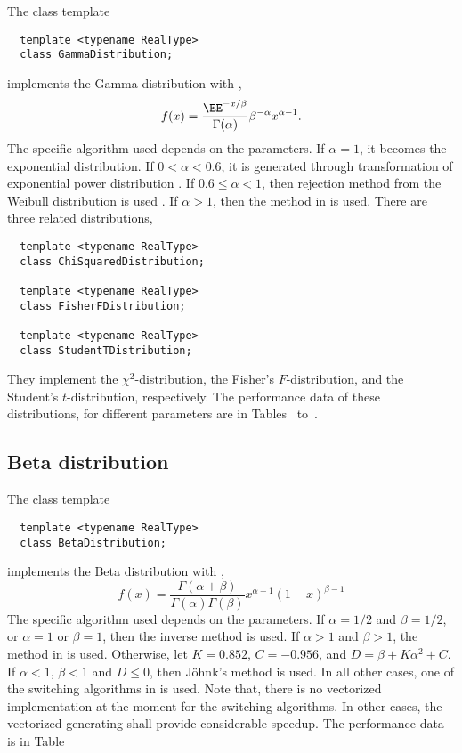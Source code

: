 The class template
\begin{Verbatim}
  template <typename RealType>
  class GammaDistribution;
\end{Verbatim}
implements the Gamma distribution with \pdf,
\begin{equation*}
  f(x) = \frac{\EE^{-x/\beta}}{\Gamma(\alpha)}\beta^{-\alpha}x^{\alpha-1}.
\end{equation*}
The specific algorithm used depends on the parameters. If $\alpha = 1$, it
becomes the exponential distribution. If $0 < \alpha < 0.6$, it is generated
through transformation of exponential power distribution
\parencite[sec~2.6]{Devroye:1986gi}. If $0.6\le\alpha<1$, then rejection method
from the Weibull distribution is used \parencite[sec.~3.4]{Devroye:1986gi}. If
$\alpha > 1$, then the method in \textcite{Marsaglia:2000vq} is used. There are
three related distributions,
\begin{Verbatim}
  template <typename RealType>
  class ChiSquaredDistribution;

  template <typename RealType>
  class FisherFDistribution;

  template <typename RealType>
  class StudentTDistribution;
\end{Verbatim}
They implement the $\chi^2$-distribution, the Fisher's $F$-distribution, and
the Student's $t$-distribution, respectively. The performance data of these
distributions, for different parameters are in Tables~ to~.

\subsection{Beta distribution}
\label{sub:Beta distribution}

The class template
\begin{Verbatim}
  template <typename RealType>
  class BetaDistribution;
\end{Verbatim}
implements the Beta distribution with \pdf,
\begin{equation*}
  f(x) = \frac{\Gamma(\alpha + \beta)}{\Gamma(\alpha)\Gamma(\beta)}
  x^{\alpha - 1}(1 - x)^{\beta - 1}
\end{equation*}
The specific algorithm used depends on the parameters. If $\alpha = 1/2$ and
$\beta = 1/2$, or $\alpha = 1$ or $\beta = 1$, then the inverse method is used.
If $\alpha > 1$ and $\beta > 1$, the method in \textcite{Cheng:1978jl} is used.
Otherwise, let $K = 0.852$, $C = -0.956$, and $D = \beta + K\alpha^2 + C$. If
$\alpha < 1$, $\beta < 1$ and $D \le 0$, then Jöhnk's method
\parencite[sec.~3.5]{Devroye:1986gi} is used. In all other cases, one of the
switching algorithms in \textcite{Atkinson:1979es} is used. Note that, there is
no vectorized implementation at the moment for the switching algorithms. In
other cases, the vectorized generating shall provide considerable speedup. The
performance data is in Table~
